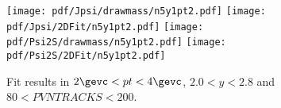 \begin{figure}[H]
\begin{center}
\texttt{[image: pdf/Jpsi/drawmass/n5y1pt2.pdf]}
\texttt{[image: pdf/Jpsi/2DFit/n5y1pt2.pdf]}
\vspace*{-0.5cm}
\texttt{[image: pdf/Psi2S/drawmass/n5y1pt2.pdf]}
\texttt{[image: pdf/Psi2S/2DFit/n5y1pt2.pdf]}
\vspace*{-0.5cm}
\end{center}
\caption{Fit results in $2\gevc<pt<4\gevc$, $2.0<y<2.8$ and $80<PVNTRACKS<200$.}
\label{Fitn5y1pt2}
\end{figure}
